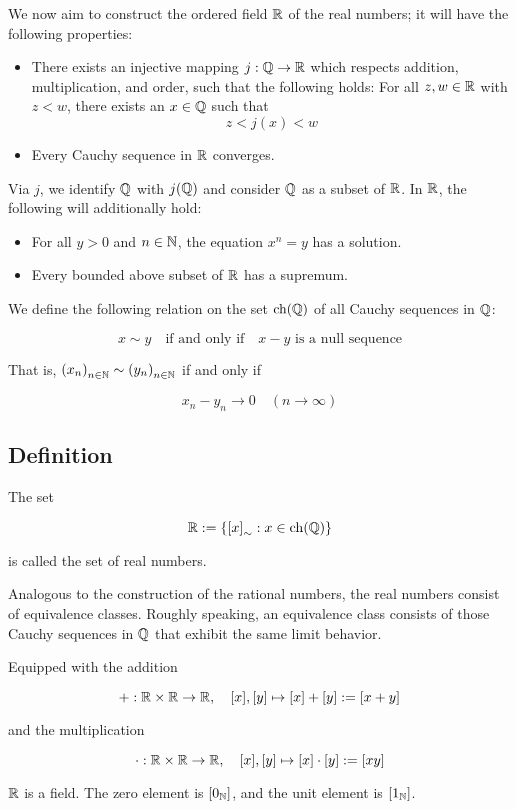 We now aim to construct the ordered field \( \mathbb{R} \) of the real numbers;
it will have the following properties:

\begin{itemize}
	
	\item There exists an injective mapping \( j : \mathbb{Q} \to \mathbb{R} \) which respects addition, multiplication, and order, such that the following holds:
		For all \( z, w \in \mathbb{R} \) with \( z < w \), there exists an \( x \in \mathbb{Q} \) such that
		\[
			z < j(x) < w
		\]

	\item Every Cauchy sequence in \( \mathbb{R} \) converges.

\end{itemize}

Via \( j \), we identify \( \mathbb{Q} \) with \( j(\mathbb{Q}) \) and consider \( \mathbb{Q} \) as a subset of \( \mathbb{R} \). In \( \mathbb{R} \), the following will additionally hold:

\begin{itemize}

	\item For all \( y > 0 \) and \( n \in \mathbb{N} \), the equation \( x^n = y \) has a solution.

	\item Every bounded above subset of \( \mathbb{R} \) has a supremum.

\end{itemize}

We define the following relation on the set \( \operatorname{ch}(\mathbb{Q}) \) of all Cauchy sequences in \( \mathbb{Q} \):

\[
	x \sim y \quad \text{if and only if} \quad x - y \text{ is a null sequence}
\]

That is, \( {(x_n)}_{n \in \mathbb{N}} \sim {(y_n)}_{n \in \mathbb{N}} \) if and only if

\[
	x_n - y_n \to 0 \quad (n \to \infty)
\]

\subsection{Definition}

The set

\[
	\mathbb{R} := \{ {[x]}_{\sim} : x \in \operatorname{ch}(\mathbb{Q}) \}
\]

is called the set of real numbers.

Analogous to the construction of the rational numbers, the real numbers consist of equivalence classes.
Roughly speaking, an equivalence class consists of those Cauchy sequences in \( \mathbb{Q} \) that exhibit the same limit behavior.

Equipped with the addition

\[
	+ : \mathbb{R} \times \mathbb{R} \to \mathbb{R}, \quad [x], [y] \mapsto [x] + [y] := [x + y]
\]

and the multiplication

\[
	\cdot : \mathbb{R} \times \mathbb{R} \to \mathbb{R}, \quad [x], [y] \mapsto [x] \cdot [y] := [xy]
\]

\( \mathbb{R} \) is a field. The zero element is \( [0_{\mathbb{N}}] \), and the unit element is \( [1_{\mathbb{N}}] \).

